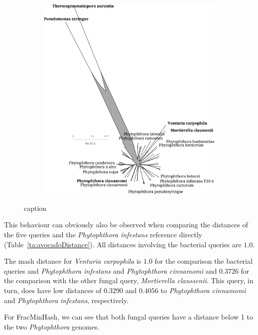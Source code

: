 \begin{figure}
\begin{subfigure}{0.49\textwidth}
    \includegraphics[width=1.0\textwidth]{figures/fmhdist_avocado4-1_k21_s2000.png}
  \end{subfigure}
  \caption{caption}
  \label{fig:avocadoOutlineComparison}
\end{figure}

This behaviour can obviously also be observed when comparing the distances of
the five queries and the \textit{Phytophthora infestans} reference directly
(Table~\ref{ta:avocadoDistance}). All distances involving the bacterial queries
are $1.0$.

The mash distance for \textit{Venturia carpophila} is $1.0$ for the comparison
the bacterial queries and \textit{Phytophthora infestans} and
\textit{Phytophthora cinnamomi} and $0.3726$ for the comparison with the other
fungal query, \textit{Mortierella claussenii}. This query, in turn, does have
low distances of $0.3290$ and $0.4056$ to \textit{Phytophthora cinnamomi} and
\textit{Phytophthora infestans}, respectively.

For FracMinHash, we can see that both fungal queries have a distance below 1 to
the two \textit{Phytophthora} genomes.


